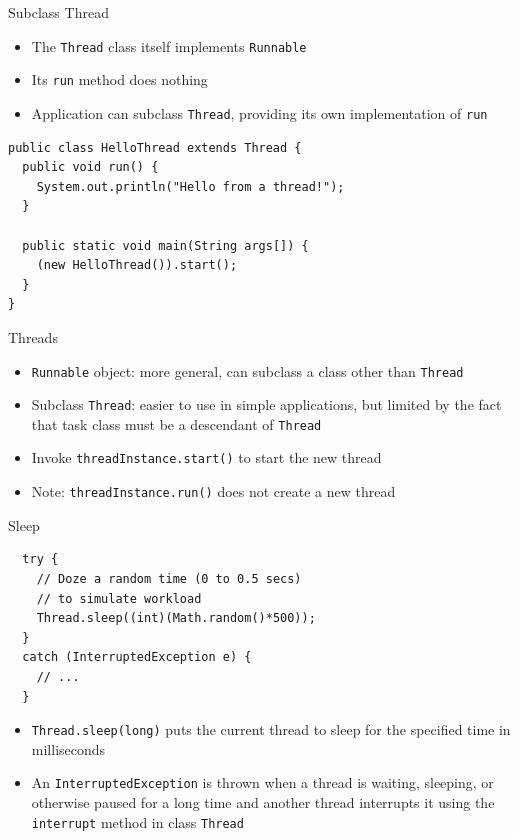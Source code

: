 \begin{frame}[fragile]{Subclass Thread}
  \begin{itemize}
  \item The \lstinline!Thread! class itself implements
    \lstinline!Runnable!
  \item Its \lstinline!run! method does nothing
  \item Application can subclass \lstinline!Thread!, providing its own
    implementation of \lstinline!run!
  \end{itemize}


  \begin{lstlisting}
public class HelloThread extends Thread {
  public void run() {
    System.out.println("Hello from a thread!");
  }
  
  public static void main(String args[]) {
    (new HelloThread()).start();
  }  
}
  \end{lstlisting}
\end{frame}

\begin{frame}{Threads}
  \begin{itemize}
  \item \lstinline!Runnable! object: more general, can subclass a
    class other than \lstinline!Thread!
  \item Subclass \lstinline!Thread!: easier to use in simple
    applications, but limited by the fact that task class must be a
    descendant of \lstinline!Thread!
  \item Invoke \lstinline!threadInstance.start()! to start the new
    thread
  \item \alert{Note:} \lstinline!threadInstance.run()! does not create
    a new thread
  \end{itemize}
\end{frame}

\begin{frame}[fragile]{Sleep}
  \begin{lstlisting}
  try {	
    // Doze a random time (0 to 0.5 secs)	
    // to simulate workload	
    Thread.sleep((int)(Math.random()*500));
  } 
  catch (InterruptedException e) { 
    // ... 
  }  
  \end{lstlisting}


  \begin{itemize}
  \item \lstinline!Thread.sleep(long)! puts the current thread to
    sleep for the specified time in milliseconds
  \item An \lstinline!InterruptedException! is thrown when a thread is
    waiting, sleeping, or otherwise paused for a long time and another
    thread interrupts it using the \lstinline!interrupt! method in
    class \lstinline!Thread!
  \end{itemize}
\end{frame}

